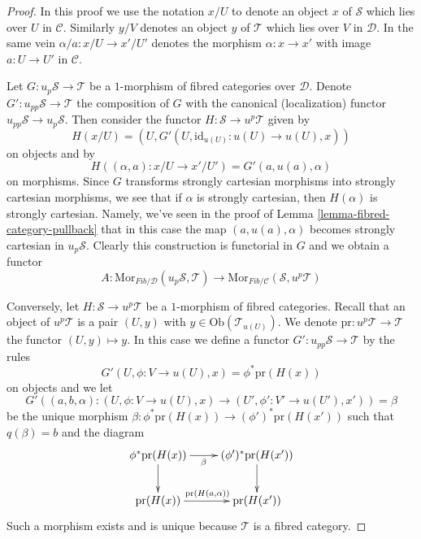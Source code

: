 \begin{proof}
In this proof we use the notation $x/U$ to denote an object
$x$ of $\mathcal{S}$ which lies over $U$ in $\mathcal{C}$.
Similarly $y/V$ denotes an object $y$ of $\mathcal{T}$
which lies over $V$ in $\mathcal{D}$. In the same vein
$\alpha/a : x/U \to x'/U'$ denotes the morphism
$\alpha : x \to x'$ with image $a : U \to U'$ in $\mathcal{C}$.

\medskip\noindent
Let $G : u_p\mathcal{S} \to \mathcal{T}$ be a $1$-morphism of fibred
categories over $\mathcal{D}$. Denote $G' : u_{pp}\mathcal{S} \to \mathcal{T}$
the composition of $G$ with the canonical (localization) functor
$u_{pp}\mathcal{S} \to u_p\mathcal{S}$. Then consider the functor
$H : \mathcal{S} \to u^p\mathcal{T}$ given by
$$
H(x/U) = (U, G'(U, \text{id}_{u(U)} : u(U) \to u(U), x))
$$
on objects and by
$$
H((\alpha, a) : x/U \to x'/U') = G'(a, u(a), \alpha)
$$
on morphisms. Since $G$ transforms strongly cartesian morphisms
into strongly cartesian morphisms, we see that if $\alpha$ is strongly
cartesian, then $H(\alpha)$ is strongly cartesian.
Namely, we've seen in the proof of
Lemma \ref{lemma-fibred-category-pullback}
that in this case the map $(a, u(a), \alpha)$ becomes
strongly cartesian in $u_p\mathcal{S}$. Clearly this construction is
functorial in $G$ and we obtain a functor
$$
A :
\text{Mor}_{\textit{Fib}/\mathcal{D}}(u_p\mathcal{S}, \mathcal{T})
\longrightarrow
\text{Mor}_{\textit{Fib}/\mathcal{C}}(\mathcal{S}, u^p\mathcal{T})
$$

\medskip\noindent
Conversely, let $H : \mathcal{S} \to u^p\mathcal{T}$ be a $1$-morphism
of fibred categories. Recall that an object of $u^p\mathcal{T}$ is
a pair $(U, y)$ with $y \in \text{Ob}(\mathcal{T}_{u(U)})$. We denote
$\text{pr} : u^p\mathcal{T} \to \mathcal{T}$ the functor $(U, y) \mapsto y$.
In this case we define a functor
$G' : u_{pp}\mathcal{S} \to \mathcal{T}$ by the rules
$$
G'(U, \phi : V \to u(U), x) = \phi^*\text{pr}(H(x))
$$
on objects and we let
$$
G'((a, b, \alpha) : (U, \phi : V \to u(U), x)
\to (U', \phi' : V' \to u(U'), x'))
=
\beta
$$
be the unique morphism
$\beta : \phi^*\text{pr}(H(x)) \to (\phi')^*\text{pr}(H(x'))$
such that $q(\beta) = b$ and the diagram
$$
\xymatrix{
\phi^*\text{pr}(H(x)) \ar[d] \ar[r]_-{\beta} &
(\phi')^*\text{pr}(H(x')) \ar[d] \\
\text{pr}(H(x)) \ar[r]^{\text{pr}(H(a, \alpha))} & \text{pr}(H(x'))
}
$$
Such a morphism exists and is unique because $\mathcal{T}$ is a fibred
category.


\end{proof}
